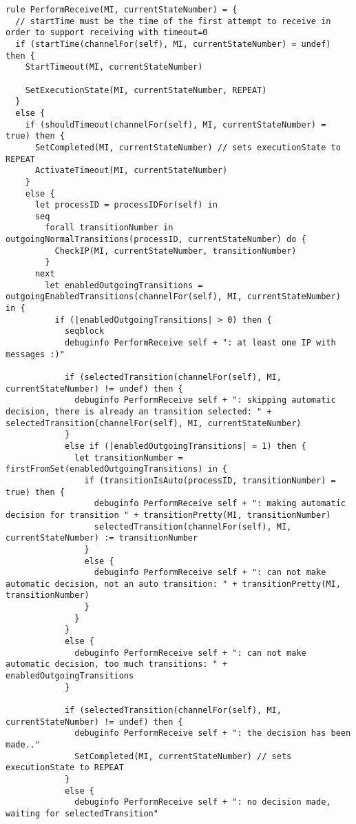 \begin{listing}[H]
\begin{verbatim}
rule PerformReceive(MI, currentStateNumber) = {
  // startTime must be the time of the first attempt to receive in order to support receiving with timeout=0
  if (startTime(channelFor(self), MI, currentStateNumber) = undef) then {
    StartTimeout(MI, currentStateNumber)

    SetExecutionState(MI, currentStateNumber, REPEAT)
  }
  else {
    if (shouldTimeout(channelFor(self), MI, currentStateNumber) = true) then {
      SetCompleted(MI, currentStateNumber) // sets executionState to REPEAT
      ActivateTimeout(MI, currentStateNumber)
    }
    else {
      let processID = processIDFor(self) in
      seq
        forall transitionNumber in outgoingNormalTransitions(processID, currentStateNumber) do {
          CheckIP(MI, currentStateNumber, transitionNumber)
        }
      next
        let enabledOutgoingTransitions = outgoingEnabledTransitions(channelFor(self), MI, currentStateNumber) in {
          if (|enabledOutgoingTransitions| > 0) then {
            seqblock
            debuginfo PerformReceive self + ": at least one IP with messages :)"

            if (selectedTransition(channelFor(self), MI, currentStateNumber) != undef) then {
              debuginfo PerformReceive self + ": skipping automatic decision, there is already an transition selected: " + selectedTransition(channelFor(self), MI, currentStateNumber)
            }
            else if (|enabledOutgoingTransitions| = 1) then {
              let transitionNumber = firstFromSet(enabledOutgoingTransitions) in {
                if (transitionIsAuto(processID, transitionNumber) = true) then {
                  debuginfo PerformReceive self + ": making automatic decision for transition " + transitionPretty(MI, transitionNumber)
                  selectedTransition(channelFor(self), MI, currentStateNumber) := transitionNumber
                }
                else {
                  debuginfo PerformReceive self + ": can not make automatic decision, not an auto transition: " + transitionPretty(MI, transitionNumber)
                }
              }
            }
            else {
              debuginfo PerformReceive self + ": can not make automatic decision, too much transitions: " + enabledOutgoingTransitions
            }

            if (selectedTransition(channelFor(self), MI, currentStateNumber) != undef) then {
              debuginfo PerformReceive self + ": the decision has been made.."
              SetCompleted(MI, currentStateNumber) // sets executionState to REPEAT
            }
            else {
              debuginfo PerformReceive self + ": no decision made, waiting for selectedTransition"


\end{verbatim}
\end{listing}
